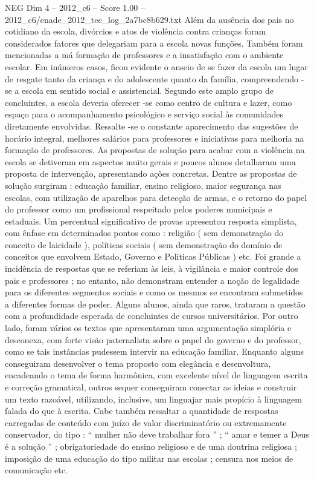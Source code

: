 \begin{textsample}{NEG Dim 4 – 2012\_c6 – Score 1.00 – 2012\_c6/enade\_2012\_tec\_log\_2a7bc8b629.txt}
Além da ausência dos pais no cotidiano da escola, divórcios e atos de violência contra crianças foram considerados fatores que delegariam para a escola novas funções.
Também foram mencionadas a má formação de professores e a insatisfação com o ambiente escolar.
Em inúmeros casos, ficou evidente o anseio de se fazer da escola um lugar de resgate tanto da criança e do adolescente quanto da família, compreendendo -se a escola em sentido social e assistencial.
Segundo este amplo grupo de concluintes, a escola deveria oferecer -se como centro de cultura e lazer, como espaço para o acompanhamento psicológico e serviço social às comunidades diretamente envolvidas.
Ressalte -se o constante aparecimento das sugestões de horário integral, melhores salários para professores e iniciativas para melhoria na formação de professores.
As propostas de solução para acabar com a violência na escola se detiveram em aspectos muito gerais e poucos alunos detalharam uma proposta de intervenção, apresentando ações concretas.
Dentre as propostas de solução surgiram : educação familiar, ensino religioso, maior segurança nas escolas, com utilização de aparelhos para detecção de armas, e o retorno do papel do professor como um profissional respeitado pelos poderes municipais e estaduais.
Um percentual significativo de provas apresentou resposta simplista, com ênfase em determinados pontos como : religião ( sem demonstração do conceito de laicidade ), políticas sociais ( sem demonstração do domínio de conceitos que envolvem Estado, Governo e Politicas Públicas ) etc.
Foi grande a incidência de respostas que se referiam às leis, à vigilância e maior controle dos pais e professores ; no entanto, não demonstram entender a noção de legalidade para os diferentes segmentos sociais e como os mesmos se encontram submetidos a diferentes formas de poder.
Alguns alunos, ainda que raros, trataram a questão com a profundidade esperada de concluintes de cursos universitários.
Por outro lado, foram vários os textos que apresentaram uma argumentação simplória e desconexa, com forte visão paternalista sobre o papel do governo e do professor, como se tais instâncias pudessem intervir na educação familiar.
Enquanto alguns conseguiram desenvolver o tema proposto com elegância e desenvoltura, encadeando o tema de forma harmônica, com excelente nível de linguagem escrita e correção gramatical, outros sequer conseguiram conectar as ideias e construir um texto razoável, utilizando, inclusive, um linguajar mais propício à linguagem falada do que à escrita.
Cabe também ressaltar a quantidade de respostas carregadas de conteúdo com juízo de valor discriminatório ou extremamente conservador, do tipo : “ mulher não deve trabalhar fora ” ; “ amar e temer a Deus é a solução ” ; obrigatoriedade do ensino religioso e de uma doutrina religiosa ; imposição de uma educação do tipo militar nas escolas ; censura nos meios de comunicação etc.

\end{textsample}
